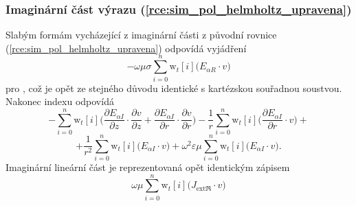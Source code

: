 \subsubsection*{Imaginární část výrazu (\ref{rce:sim_pol_helmholtz_upravena})}
Slabým formám vycházející z imaginární části z původní rovnice (\ref{rce:sim_pol_helmholtz_upravena}) odpovídá vyjádření
\begin{equation}
 -\omega\mu\sigma\sum_{i=0}^{n}\mathrm{w}_{t}[i]\bigg(E_{\alpha R}\cdot v\bigg)
	\label{rce:sim_pol_bilinear_imag_real} 
\end{equation}
pro , což je opět ze stejného důvodu identické s kartézskou souřadnou soustvou. Nakonec indexu  odpovídá
\begin{displaymath}
-\sum_{i=0}^{n}\mathrm{w}_{t}[i]\bigg(\frac{\partial E_{\alpha I}}{\partial z}\cdot \frac{\partial v}{\partial z} + \frac{\partial E_{\alpha I}}{\partial r}\cdot \frac{\partial v}{\partial r} \bigg) - \frac{1}{r}\sum_{i=0}^{n}\mathrm{w}_{t}[i]\bigg(\frac{\partial E_{\alpha I}}{\partial r}\cdot v\bigg) +
\end{displaymath}
\begin{equation}
	 + \frac{1}{r^{2}}\sum_{i=0}^{n}\mathrm{w}_{t}[i]\bigg(E_{\alpha I}\cdot v\bigg) + \omega^{2}\varepsilon\mu\sum_{i=0}^{n}\mathrm{w}_{t}[i]\bigg(E_{\alpha I}\cdot v\bigg).
	\label{rce:sim_pol_bilinear_imag_imag} 
\end{equation}
Imaginární lineární část je reprezentovaná opět identickým zápisem
\begin{equation}
 \omega\mu\sum_{i=0}^{n}\mathrm{w}_{t}[i]\bigg(J_{\mathrm{ext}\Re}\cdot v\bigg)
	\label{rce:sim_pol_linear_imag_num} 
\end{equation}